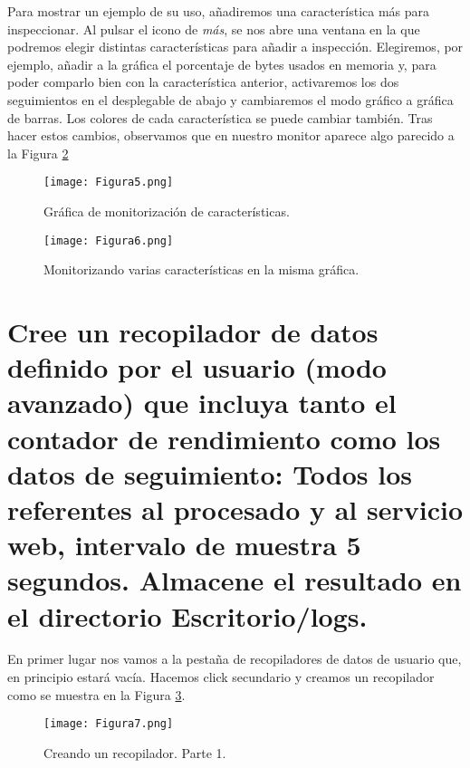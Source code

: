 \vspace{5mm}

Para mostrar un ejemplo de su uso, añadiremos una característica más para inspeccionar. Al pulsar el icono de \textit{más}, se nos abre una ventana en la que 
podremos elegir distintas características para añadir a inspección. Elegiremos, por ejemplo, añadir a la gráfica el porcentaje de bytes usados en memoria y, para
poder comparlo bien con la característica anterior, activaremos los dos seguimientos en el desplegable de abajo y cambiaremos el modo gráfico a gráfica de barras.
Los colores de cada característica se puede cambiar también. Tras hacer estos cambios, observamos que en nuestro monitor aparece algo parecido a 
la Figura \ref{fig:figura6} 

\begin{figure}[H] 
\centering
\texttt{[image: Figura5.png]}  
\caption{Gráfica de monitorización de características.}\label{fig:figura5}
\end{figure}
\begin{figure}[H] 
\centering
\texttt{[image: Figura6.png]}  
\caption{Monitorizando varias características en la misma gráfica.}\label{fig:figura6}
\end{figure}




\section{Cree un recopilador de datos definido por el usuario (modo avanzado) que incluya tanto el contador de rendimiento como los datos de seguimiento: Todos los referentes al procesado y al servicio web, intervalo de muestra 5 segundos. Almacene el resultado en el directorio Escritorio/logs.}

En primer lugar nos vamos a la pestaña de recopiladores de datos de usuario que, en principio estará vacía. Hacemos click secundario y creamos un recopilador como
se muestra en la Figura \ref{fig:figura7}.

\begin{figure}[H] 
\centering
\texttt{[image: Figura7.png]}  
\caption{Creando un recopilador. Parte 1.}\label{fig:figura7}
\end{figure}


